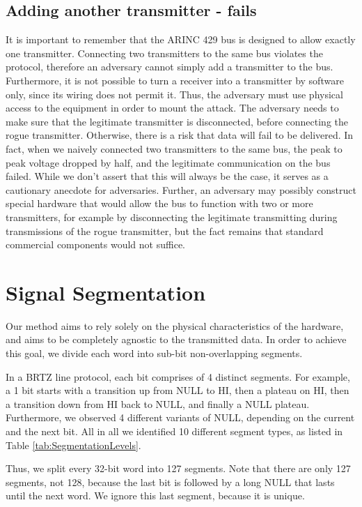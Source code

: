 \documentclass[conference]{IEEEtran}
\begin{document}
\subsection{Adding another transmitter - fails}
  It is important to remember that the ARINC 429 bus is designed to allow exactly one transmitter. Connecting two transmitters to the same bus violates the protocol, therefore an adversary cannot simply add a transmitter to the bus. Furthermore, it is not possible to turn a receiver into a transmitter by software only, since its wiring does not permit it. Thus, the adversary must use physical access to the equipment in order to mount the attack. The adversary needs to make sure that the legitimate transmitter is disconnected, before connecting the rogue transmitter. Otherwise, there is a risk that data will fail to be delivered. In fact, when we naively connected two transmitters to the same bus, the peak to peak voltage dropped by half, and the legitimate communication on the bus failed. While we don't assert that this will always be the case, it serves as a cautionary anecdote for adversaries. Further, an adversary may possibly construct special hardware that would allow the bus to function with two or more transmitters, for example by disconnecting the legitimate transmitting during transmissions of the rogue transmitter, but the fact remains that standard commercial components would not suffice.

\section{Signal Segmentation}
  Our method aims to rely solely on the physical characteristics of the hardware, and aims to be completely agnostic to the transmitted data. In order to achieve this goal, we divide each word into sub-bit non-overlapping segments.
  
  In a BRTZ line protocol, each bit comprises of 4 distinct segments. For example, a 1 bit starts with a transition up from NULL to HI, then a plateau on HI, then a transition down from HI back to NULL, and finally a NULL plateau. Furthermore, we observed 4 different variants of NULL, depending on the current and the next bit. All in all we identified 10 different segment types, as listed in Table \ref{tab:SegmentationLevels}.
  
  Thus, we split every 32-bit word into 127 segments. Note that there are only 127 segments, not 128, because the last bit is followed by a long NULL that lasts until the next word. We ignore this last segment, because it is unique.
  
\end{document}
